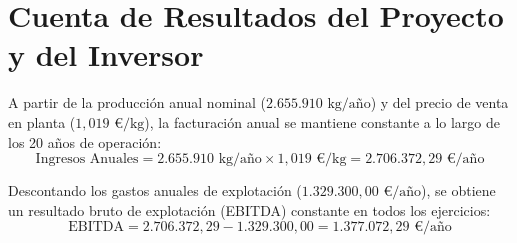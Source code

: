\documentclass[a4paper,11pt]{report}
\providecommand{\euro}{€}
\begin{document}
\section{Cuenta de Resultados del Proyecto y del Inversor}
A partir de la producción anual nominal ($2.655.910\text{ kg/año}$) y del precio de venta en planta ($1,019\text{ \euro/kg}$), la facturación anual se mantiene constante a lo largo de los 20 años de operación:
\begin{equation}
    \text{Ingresos Anuales} = 2.655.910\text{ kg/año} \times 1,019\text{ \euro/kg} = 2.706.372,29\text{ \euro/año}
\end{equation}

Descontando los gastos anuales de explotación ($1.329.300,00\text{ \euro/año}$), se obtiene un resultado bruto de explotación (EBITDA) constante en todos los ejercicios:
\begin{equation}
    \text{EBITDA} = 2.706.372,29 - 1.329.300,00 = 1.377.072,29\text{ \euro/año}
\end{equation}
\end{document}
